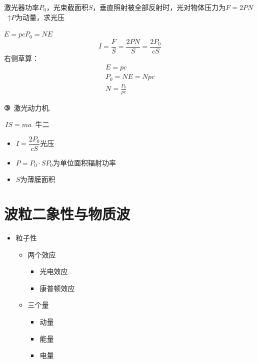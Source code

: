 \begin{problem}[{②}]
激光器功率$P_0$，光束截面积$S$，垂直照射被全部反射时，光对物体压力为$F=2PN$\ ↑\quad $P$为动量，求光压 %
\begin{solution}
$E=pc$\qquad $P_0=NE$ %
\[
I=\frac FS=\frac{2PN}{S}=\frac{2P_0}{cS}
\]
右侧草算：
\begin{gather*}
E=pc\\
P_0=NE=Npc\\
\boxed{N=\frac{P_0}{pc}} %
\end{gather*}
\red{$\checkmark$} %
\end{solution}
\end{problem}

\textbf{③}\ 激光动力机.

\,$IS=ma$\ 牛二
\begin{itemize}
\item $I=\dfrac{2P_0}{cS}$\quad 光压 %
\item $P=P_0\cdot S$\quad $P_0$为单位面积辐射功率
\item $S$为薄膜面积
\end{itemize}


\section{波粒二象性与物质波}
\begin{itemize}
\item 粒子性
  \begin{itemize}
  \item 两个效应
    \begin{itemize}
    \item 光电效应
    \item 康普顿效应
    \end{itemize}
  \item 三个量
    \begin{itemize}
    \item 动量
    \item 能量
    \item 电量
    \end{itemize}
  \end{itemize}
\end{itemize}

